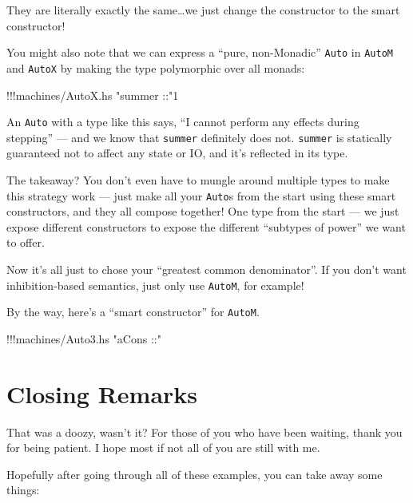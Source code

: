 \documentclass[]{article}
\newenvironment{Shaded}{}{}
\newcommand{\DecValTok}[1]{\textcolor[rgb]{0.25,0.63,0.44}{{#1}}}
\newcommand{\StringTok}[1]{\textcolor[rgb]{0.25,0.44,0.63}{{#1}}}
\newcommand{\FunctionTok}[1]{\textcolor[rgb]{0.02,0.16,0.49}{{#1}}}
\newcommand{\NormalTok}[1]{{#1}}
\begin{document}
They are literally exactly the same\ldots{}we just change the
constructor to the smart constructor!

You might also note that we can express a ``pure, non-Monadic''
\texttt{Auto} in \texttt{AutoM} and \texttt{AutoX} by making the type
polymorphic over all monads:

\begin{Shaded}
\begin{Highlighting}[]
\FunctionTok{!!!}\NormalTok{machines}\FunctionTok{/}\NormalTok{AutoX.hs }\StringTok{"summer ::"}\DecValTok{1}
\end{Highlighting}
\end{Shaded}

An \texttt{Auto} with a type like this says, ``I cannot perform any
effects during stepping'' --- and we know that \texttt{summer}
definitely does not. \texttt{summer} is statically guaranteed not to
affect any state or IO, and it's reflected in its type.

The takeaway? You don't even have to mungle around multiple types to
make this strategy work --- just make all your \texttt{Auto}s from the
start using these smart constructors, and they all compose together! One
type from the start --- we just expose different constructors to expose
the different ``subtypes of power'' we want to offer.

Now it's all just to chose your ``greatest common denominator''. If you
don't want inhibition-based semantics, just only use \texttt{AutoM}, for
example!

By the way, here's a ``smart constructor'' for \texttt{AutoM}.

\begin{Shaded}
\begin{Highlighting}[]
\FunctionTok{!!!}\NormalTok{machines}\FunctionTok{/}\NormalTok{Auto3.hs }\StringTok{"aCons ::"}
\end{Highlighting}
\end{Shaded}

\section{Closing Remarks}\label{closing-remarks}

That was a doozy, wasn't it? For those of you who have been waiting,
thank you for being patient. I hope most if not all of you are still
with me.

Hopefully after going through all of these examples, you can take away
some things:
\end{document}
